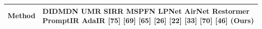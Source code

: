 \begin{tabular}{ll}
\toprule
Method & DIDMDN UMR SIRR MSPFN LPNet AirNet Restormer PromptIR AdaIR [75] [69] [65] [26] [22] [33] [70] [46] (Ours) \\
\midrule
\bottomrule
\end{tabular}
